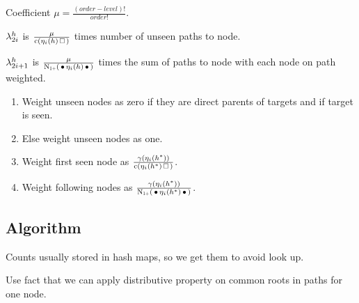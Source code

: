 \begin{draft}
Coefficient $\mu = \frac{(order - level)!}{order!}$.
\end{draft}

\begin{draft}
$\lambda_{2 i}^h$ is $\frac{\mu}{\Count(\History_i(h) \Skp)}$ times number
of unseen paths to node.

$\lambda_{2 i + 1}^h$ is
$\frac{\mu}{\ContCountIp(\WSkp \History_i(h) \WSkp)}$ times the sum of paths to
node with each node on path weighted.
\begin{enumerate}
  \item Weight unseen nodes as zero if they are direct parents of targets and if
    target is seen.
  \item Else weight unseen nodes as one.
  \item Weight first seen node as $\frac{\gamma(\History_i(h^*))}{\Count(\History_i(h^*) \Skp)}$.
  \item Weight following nodes as $\frac{\gamma(\History_i(h^*))}{\ContCountIp(\WSkp \History_i(h^*) \WSkp)}$.
\end{enumerate}
\end{draft}


\subsection{Algorithm}

\begin{draft}
Counts usually stored in hash maps, so we get them to avoid look up.

Use fact that we can apply distributive property on common roots in paths for
one node.
\end{draft}

